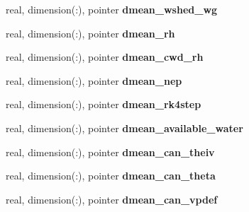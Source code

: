 \begin{DoxyCompactItemize}
\item 
\hypertarget{structed__state__vars_1_1edtype_adb7acfbb19af665157ad695416d17b2d}{
real, dimension(:), pointer {\bfseries dmean\_\-wshed\_\-wg}}
\label{structed__state__vars_1_1edtype_adb7acfbb19af665157ad695416d17b2d}

\item 
\hypertarget{structed__state__vars_1_1edtype_a98bebefba53b1dc77db0b402a20a1364}{
real, dimension(:), pointer {\bfseries dmean\_\-rh}}
\label{structed__state__vars_1_1edtype_a98bebefba53b1dc77db0b402a20a1364}

\item 
\hypertarget{structed__state__vars_1_1edtype_a2c85164a90fb9e2ed1d31263913c297f}{
real, dimension(:), pointer {\bfseries dmean\_\-cwd\_\-rh}}
\label{structed__state__vars_1_1edtype_a2c85164a90fb9e2ed1d31263913c297f}

\item 
\hypertarget{structed__state__vars_1_1edtype_a4ed6fc7b2aa812f304f4c3f078fac5ff}{
real, dimension(:), pointer {\bfseries dmean\_\-nep}}
\label{structed__state__vars_1_1edtype_a4ed6fc7b2aa812f304f4c3f078fac5ff}

\item 
\hypertarget{structed__state__vars_1_1edtype_a8173c770e44b73b86835452bb6a6f834}{
real, dimension(:), pointer {\bfseries dmean\_\-rk4step}}
\label{structed__state__vars_1_1edtype_a8173c770e44b73b86835452bb6a6f834}

\item 
\hypertarget{structed__state__vars_1_1edtype_a176b37c4ec4115107a1c1861c678ca91}{
real, dimension(:), pointer {\bfseries dmean\_\-available\_\-water}}
\label{structed__state__vars_1_1edtype_a176b37c4ec4115107a1c1861c678ca91}

\item 
\hypertarget{structed__state__vars_1_1edtype_a93922139b3fadf04b4df441f45ef8b66}{
real, dimension(:), pointer {\bfseries dmean\_\-can\_\-theiv}}
\label{structed__state__vars_1_1edtype_a93922139b3fadf04b4df441f45ef8b66}

\item 
\hypertarget{structed__state__vars_1_1edtype_a3c253077c3091b04f673b7f54f969f86}{
real, dimension(:), pointer {\bfseries dmean\_\-can\_\-theta}}
\label{structed__state__vars_1_1edtype_a3c253077c3091b04f673b7f54f969f86}

\item 
\hypertarget{structed__state__vars_1_1edtype_a2fcf15d3a0aa0ac9efaa519c3c54d2dd}{
real, dimension(:), pointer {\bfseries dmean\_\-can\_\-vpdef}}
\label{structed__state__vars_1_1edtype_a2fcf15d3a0aa0ac9efaa519c3c54d2dd}


\end{DoxyCompactItemize}
